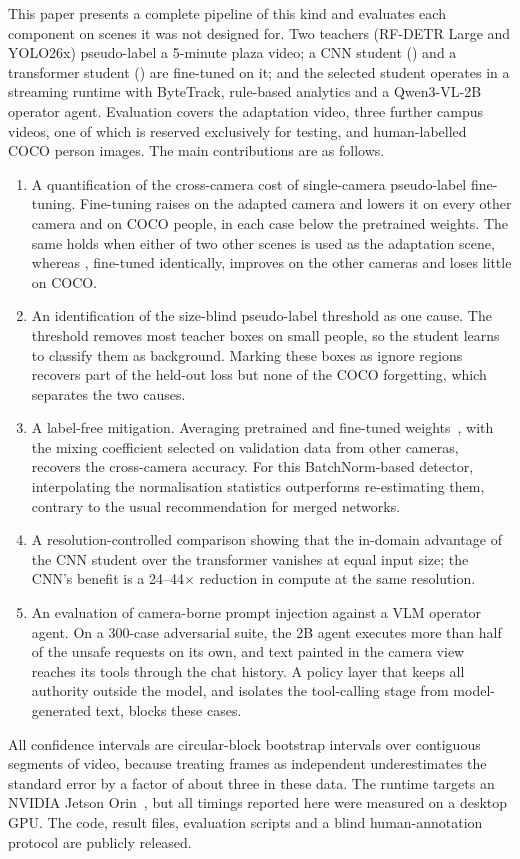 This paper presents a complete pipeline of this kind and evaluates each component on scenes it was not designed for.
Two teachers (RF-DETR Large and YOLO26x) pseudo-label a 5-minute plaza video; a CNN student (\yolo{}) and a
transformer student (\rfdetr{}) are fine-tuned on it; and the selected student operates in a streaming runtime with
ByteTrack, rule-based analytics and a Qwen3-VL-2B operator agent. Evaluation covers the adaptation video, three
further campus videos, one of which is reserved exclusively for testing, and human-labelled COCO person images. The
main contributions are as follows.
\begin{enumerate}
\item A quantification of the cross-camera cost of single-camera pseudo-label fine-tuning. Fine-tuning \yolo{} raises
\AP{} on the adapted camera and lowers it on every other camera and on COCO people, in each case below the
pretrained weights. The same holds when either of two other scenes is used as the adaptation scene, whereas \rfdetr{},
fine-tuned identically, improves on the other cameras and loses little on COCO.
\item An identification of the size-blind pseudo-label threshold as one cause. The threshold removes most teacher
boxes on small people, so the student learns to classify them as background. Marking these boxes as ignore regions
recovers part of the held-out loss but none of the COCO forgetting, which separates the two causes.
\item A label-free mitigation. Averaging pretrained and fine-tuned weights~\cite{wortsman2022wise}, with the mixing
coefficient selected on validation data from other cameras, recovers the cross-camera accuracy. For this
BatchNorm-based detector, interpolating the normalisation statistics outperforms re-estimating them, contrary to the
usual recommendation for merged networks.
\item A resolution-controlled comparison showing that the in-domain advantage of the CNN student over the
transformer vanishes at equal input size; the CNN's benefit is a 24--44$\times$ reduction in compute at the same
resolution.
\item An evaluation of camera-borne prompt injection against a VLM operator agent. On a 300-case adversarial suite,
the 2B agent executes more than half of the unsafe requests on its own, and text painted in the camera view reaches
its tools through the chat history. A policy layer that keeps all authority outside the model, and isolates the
tool-calling stage from model-generated text, blocks these cases.
\end{enumerate}
All confidence intervals are circular-block bootstrap intervals over contiguous segments of video, because treating
frames as independent underestimates the standard error by a factor of about three in these data. The runtime
targets an NVIDIA Jetson Orin~\cite{jetsonorin}, but all timings reported here were measured on a desktop GPU. The
code, result files, evaluation scripts and a blind human-annotation protocol are publicly released.
